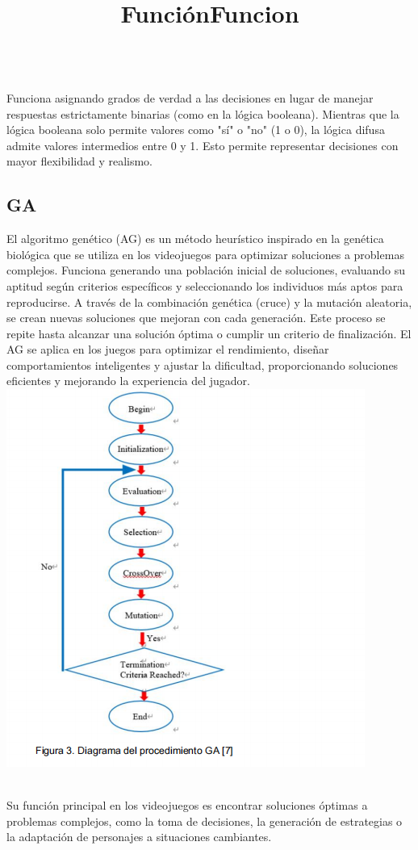 \documentclass{article}
\begin{document}
\title{\textbf{Función}}
\\
Funciona asignando grados de verdad a las decisiones en lugar de manejar respuestas estrictamente binarias (como en la lógica booleana). Mientras que la lógica booleana solo permite valores como "sí" o "no" (1 o 0), la lógica difusa admite valores intermedios entre 0 y 1. Esto permite representar decisiones con mayor flexibilidad y realismo.


\subsection{GA} 
El algoritmo genético (AG) es un método heurístico inspirado en la genética biológica que se utiliza en los videojuegos para optimizar soluciones a problemas complejos. Funciona generando una población inicial de soluciones, evaluando su aptitud según criterios específicos y seleccionando los individuos más aptos para reproducirse. A través de la combinación genética (cruce) y la mutación aleatoria, se crean nuevas soluciones que mejoran con cada generación. Este proceso se repite hasta alcanzar una solución óptima o cumplir un criterio de finalización. El AG se aplica en los juegos para optimizar el rendimiento, diseñar comportamientos inteligentes y ajustar la dificultad, proporcionando soluciones eficientes y mejorando la experiencia del jugador.
\\

\includegraphics{GA.png}
\\
\title{\textbf{Funcion}}
\\
Su función principal en los videojuegos es encontrar soluciones óptimas a problemas complejos, como la toma de decisiones, la generación de estrategias o la adaptación de personajes a situaciones cambiantes.
\end{document}
